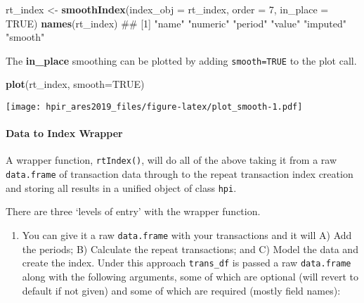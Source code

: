 \documentclass[]{article}
\newenvironment{Shaded}{\begin{snugshade}}{\end{snugshade}}
\newcommand{\KeywordTok}[1]{\textcolor[rgb]{0.13,0.29,0.53}{\textbf{#1}}}
\newcommand{\DataTypeTok}[1]{\textcolor[rgb]{0.13,0.29,0.53}{#1}}
\newcommand{\DecValTok}[1]{\textcolor[rgb]{0.00,0.00,0.81}{#1}}
\newcommand{\StringTok}[1]{\textcolor[rgb]{0.31,0.60,0.02}{#1}}
\newcommand{\OtherTok}[1]{\textcolor[rgb]{0.56,0.35,0.01}{#1}}
\newcommand{\NormalTok}[1]{#1}
\providecommand{\tightlist}{%
  \setlength{\itemsep}{0pt}\setlength{\parskip}{0pt}}
\let\oldparagraph\paragraph
\renewcommand{\paragraph}[1]{\oldparagraph{#1}\mbox{}}
\begin{document}
\begin{Shaded}
\begin{Highlighting}[]
\NormalTok{   rt_index <-}\StringTok{ }\KeywordTok{smoothIndex}\NormalTok{(}\DataTypeTok{index_obj =}\NormalTok{ rt_index,}
                           \DataTypeTok{order =} \DecValTok{7}\NormalTok{,}
                           \DataTypeTok{in_place =} \OtherTok{TRUE}\NormalTok{)}
   \KeywordTok{names}\NormalTok{(rt_index)}
\NormalTok{## [1] "name"    "numeric" "period"  "value"   "imputed" "smooth"}
\end{Highlighting}
\end{Shaded}

The \textbf{in\_place} smoothing can be plotted by adding
\texttt{smooth=TRUE} to the plot call.

\begin{Shaded}
\begin{Highlighting}[]
   \KeywordTok{plot}\NormalTok{(rt_index, }\DataTypeTok{smooth=}\OtherTok{TRUE}\NormalTok{)}
\end{Highlighting}
\end{Shaded}

\texttt{[image: hpir\_ares2019\_files/figure-latex/plot\_smooth-1.pdf]}

\paragraph{Data to Index Wrapper}\label{data-to-index-wrapper}

A wrapper function, \texttt{rtIndex()}, will do all of the above taking
it from a raw \texttt{data.frame} of transaction data through to the
repeat transaction index creation and storing all results in a unified
object of class \texttt{hpi}.

There are three `levels of entry' with the wrapper function.

\begin{enumerate}
\def\labelenumi{\arabic{enumi}.}
\tightlist
\item
  You can give it a raw \texttt{data.frame} with your transactions and
  it will A) Add the periods; B) Calculate the repeat transactions; and
  C) Model the data and create the index. Under this approach
  \texttt{trans\_df} is passed a raw \texttt{data.frame} along with the
  following arguments, some of which are optional (will revert to
  default if not given) and some of which are required (mostly field
  names):
\end{enumerate}
\end{document}

